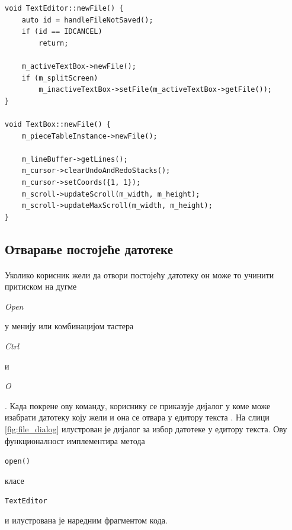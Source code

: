 \documentclass[12pt,oneside]{memoir}
\begin{document}
\begin{verbatim}
void TextEditor::newFile() {
	auto id = handleFileNotSaved();
	if (id == IDCANCEL)
		return;
	
	m_activeTextBox->newFile();
	if (m_splitScreen)
		m_inactiveTextBox->setFile(m_activeTextBox->getFile());
}

void TextBox::newFile() {
	m_pieceTableInstance->newFile();
	
	m_lineBuffer->getLines();
	m_cursor->clearUndoAndRedoStacks();
	m_cursor->setCoords({1, 1});
	m_scroll->updateScroll(m_width, m_height);
	m_scroll->updateMaxScroll(m_width, m_height);
}
\end{verbatim}

\subsection{Отварање постојеће датотеке}
\paragraph{}
Уколико корисник жели да отвори постојећу датотеку он може то учинити притиском
на дугме \begin{latinica}\textit{Open}\end{latinica} у менију или комбинацијом
тастера \begin{latinica}\textit{Ctrl}\end{latinica} и \begin{latinica}\textit{O}\end{latinica}. Када покрене ову команду, кориснику
се приказује дијалог у коме може изабрати датотеку коју жели и она се отвара у едитору текста . На слици \ref{fig:file_dialog} илустрован је дијалог за избор датотеке у едитору текста. Ову функционалност имплементира метода \begin{latinica}\verb|open()|\end{latinica} класе \begin{latinica}\verb|TextEditor|\end{latinica} и илустрована је наредним фрагментом кода.
\end{document}
